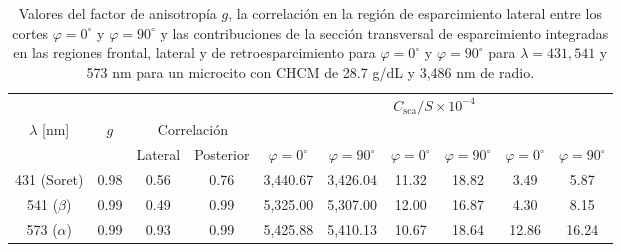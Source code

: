 \begin{table}[h!]
	\centering
	{
		\small
		\setlength{\arrayrulewidth}{0.6pt}
		\renewcommand{\arraystretch}{1.1}
		\setlength{\tabcolsep}{4pt}
		
		\begin{tabular}{cccccccccc}
			\hline
			\rowcolor{UNAMverde0!25!white}
			& & & &
			\multicolumn{6}{c}{$C_{\text{sca}}/S\times 10^{-4}$}\\
			
			\rowcolor{UNAMverde0!25!white}
			$\lambda$ [nm] &
			$g$ &
			\multicolumn{2}{c}{Correlación} &
			\multicolumn{2}{c}{\raisebox{0.6ex}{Frontal}} &
			\multicolumn{2}{c}{\raisebox{0.6ex}{Lateral}} &
			\multicolumn{2}{c}{\raisebox{0.6ex}{Posterior}}\\
			
			\rowcolor{UNAMverde0!25!white}
			& &
			Lateral & Posterior &
			$\varphi=0^\circ$ & $\varphi=90^\circ$ &
			$\varphi=0^\circ$ & $\varphi=90^\circ$ &
			$\varphi=0^\circ$ & $\varphi=90^\circ$\\
			\hline
			
			\rowcolor{UNAMverde0!12!white}
			431 (Soret) & 0.98 & 0.56 & 0.76 &
			3,440.67 & 3,426.04 &
			11.32 & 18.82 & 3.49 & 5.87\\
			
			\rowcolor{UNAMverde0!3!white}
			541 ($\beta$) & 0.99 & 0.49 & 0.99 &
			5,325.00 & 5,307.00 &
			12.00 & 16.87 & 4.30 & 8.15\\
			
			\rowcolor{UNAMverde0!12!white}
			573 ($\alpha$) & 0.99 & 0.93 & 0.99 &
			5,425.88 & 5,410.13 &
			10.67 & 18.64 & 12.86 & 16.24\\
			\hline
		\end{tabular}
	}
	
	\caption{Valores del factor de anisotropía $g$, la correlación en la región de esparcimiento lateral entre los cortes $\varphi=0^\circ$ y $\varphi=90^\circ$ y las contribuciones de la sección transversal de esparcimiento integradas en las regiones frontal, lateral y de retroesparcimiento para $\varphi=0^{\circ}$ y $\varphi=90^{\circ}$ para $\lambda=431,541$ y 573 nm para un microcito con CHCM de 28.7 g/dL y 3,486 nm de radio.}
	
	\label{table:val_micro}
\end{table}
%

